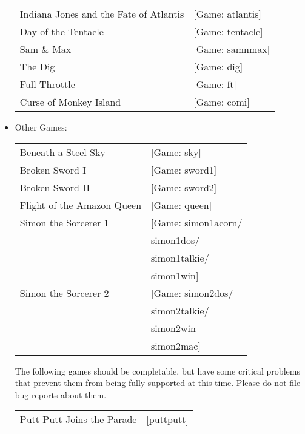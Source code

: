 \begin{itemize}
\begin {tabular} [h] {ll}
    Indiana Jones and the Fate of Atlantis&          [Game: atlantis]\\
    Day of the Tentacle&                             [Game: tentacle]\\
    Sam \& Max&                                       [Game: samnmax]\\
    The Dig&                                        [Game: dig]\\
    Full Throttle&                                 [Game: ft]\\
    Curse of Monkey Island&                          [Game: comi]\\
  \end{tabular}
\item Other Games:\\ 
  \begin{tabular}[h]{ll}
     Beneath a Steel Sky&                             [Game: sky]\\
    Broken Sword I&                                [Game: sword1]\\
    Broken Sword II&                               [Game: sword2]\\
    Flight of the Amazon Queen&                    [Game: queen]\\
     Simon the Sorcerer 1&                            [Game: simon1acorn/\\
     &                                                       simon1dos/\\
     &                                                       simon1talkie/\\
     &                                                       simon1win]\\
     Simon the Sorcerer 2&                            [Game: simon2dos/\\
     &                                                       simon2talkie/\\
     &                                                       simon2win\\
     &                                                       simon2mac]\\
  \end{tabular}

The following games should be completable, but have some critical problems that
prevent them from being fully supported at this time. Please do not file bug
reports about them.

  \begin{tabular}[h]{ll}
	Putt-Putt Joins the Parade& [puttputt]\\
  \end{tabular}


\end{itemize}
